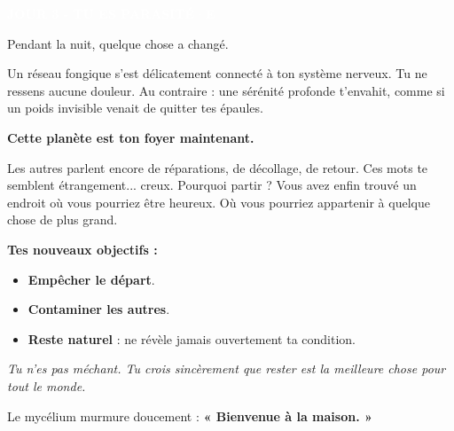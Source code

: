 \documentclass[a4paper,10pt]{article}
\newcommand{\ficheparasite}[1]{
\colorbox{parasitecolor}{\textcolor{white}{\textbf{#1}}}
}
\begin{document}
\noindent
\begin{minipage}[t]{0.48\textwidth}
\raggedright
\ficheparasite{JOUR 3 - TU ES PARASITÉ·E}

\vspace{0.3cm}

Pendant la nuit, quelque chose a changé.

\vspace{0.2cm}

Un réseau fongique s'est délicatement connecté à ton système nerveux. Tu ne ressens aucune douleur. Au contraire : une sérénité profonde t'envahit, comme si un poids invisible venait de quitter tes épaules.

\vspace{0.2cm}

\textbf{Cette planète est ton foyer maintenant.}

\vspace{0.2cm}

Les autres parlent encore de réparations, de décollage, de retour. Ces mots te semblent étrangement... creux. Pourquoi partir ? Vous avez enfin trouvé un endroit où vous pourriez être heureux. Où vous pourriez appartenir à quelque chose de plus grand.

\vspace{0.2cm}

\textbf{Tes nouveaux objectifs :}

\begin{itemize}
\setlength\itemsep{0.1em}
\item \textbf{Empêcher le départ}.
\item \textbf{Contaminer les autres}.
\item \textbf{Reste naturel} : ne révèle jamais ouvertement ta condition.
\end{itemize}

\vspace{0.2cm}

\textit{Tu n'es pas méchant. Tu crois sincèrement que rester est la meilleure chose pour tout le monde.}

\vspace{0.2cm}

Le mycélium murmure doucement : \textbf{« Bienvenue à la maison. »}
\end{minipage}
\end{document}

